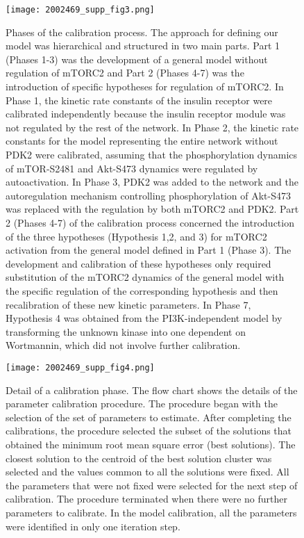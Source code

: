 \begin{figure}[tb]
	\begin{center}
		\texttt{[image: 2002469\_supp\_fig3.png]}
		\caption[Phases of the calibration process]{Phases of the calibration process. The approach for defining our model was hierarchical and structured in two main parts. Part 1 (Phases 1-3) was the development of a general model without regulation of mTORC2 and Part 2 (Phases 4-7) was the introduction of specific hypotheses for regulation of mTORC2. In Phase 1, the kinetic rate constants of the insulin receptor were calibrated independently because the insulin receptor module was not regulated by the rest of the network. In Phase 2, the kinetic rate constants for the model representing the entire network without PDK2 were calibrated, assuming that the phosphorylation dynamics of mTOR-S2481 and Akt-S473 dynamics were regulated by autoactivation. In Phase 3, PDK2 was added to the network and the autoregulation mechanism controlling phosphorylation of Akt-S473 was replaced with the regulation by both mTORC2 and PDK2. Part 2 (Phases 4-7) of the calibration process concerned the introduction of the three hypotheses 
(Hypothesis 1,2, and 3) for mTORC2 activation from the general model defined in Part 1 (Phase 3). The development and calibration of these hypotheses only required substitution of the mTORC2 dynamics of the general model with the specific regulation of the corresponding hypothesis and then recalibration of these new kinetic parameters. In Phase 7, Hypothesis 4 was obtained from the PI3K-independent model by transforming the unknown kinase into one dependent on Wortmannin, which did not involve further calibration.}
		\label{fig:2002469_supp_fig3}
	\end{center}
\end{figure}
\clearpage

\begin{figure}[tb]
	\begin{center}
		\texttt{[image: 2002469\_supp\_fig4.png]}
		\caption[Detail of a calibration phase]{Detail of a calibration phase. The flow chart shows the details of the parameter calibration procedure. The procedure began with the selection of the set of parameters to estimate. After completing the calibrations, the procedure selected the subset of the solutions that obtained the minimum root mean square error (best solutions). The closest solution to the centroid of the best solution cluster was selected and the values common to all the solutions were fixed. All the parameters that were not fixed were selected for the next step of calibration. The procedure terminated when there were no further parameters to calibrate. In the model calibration, all the parameters were identified in only one iteration step.}
		\label{fig:2002469_supp_fig4}
	\end{center}
\end{figure}
\clearpage

